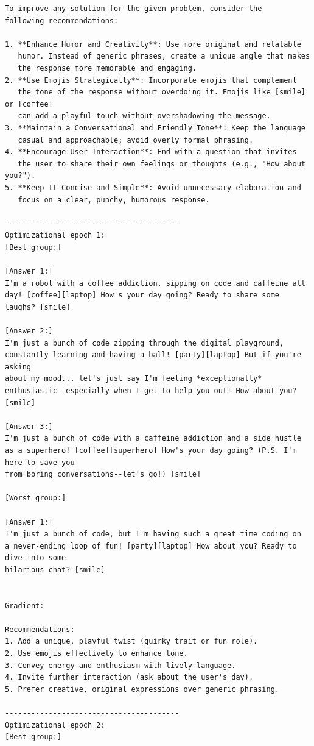 \documentclass[11pt]{article}
\theoremstyle{plain}
\theoremstyle{definition}
\theoremstyle{remark}
\begin{document}
\begin{small}
\begin{verbatim}
To improve any solution for the given problem, consider the
following recommendations:

1. **Enhance Humor and Creativity**: Use more original and relatable
   humor. Instead of generic phrases, create a unique angle that makes
   the response more memorable and engaging.
2. **Use Emojis Strategically**: Incorporate emojis that complement
   the tone of the response without overdoing it. Emojis like [smile] or [coffee]
   can add a playful touch without overshadowing the message.
3. **Maintain a Conversational and Friendly Tone**: Keep the language
   casual and approachable; avoid overly formal phrasing.
4. **Encourage User Interaction**: End with a question that invites
   the user to share their own feelings or thoughts (e.g., "How about you?").
5. **Keep It Concise and Simple**: Avoid unnecessary elaboration and
   focus on a clear, punchy, humorous response.

----------------------------------------
Optimizational epoch 1:
[Best group:]

[Answer 1:]
I'm a robot with a coffee addiction, sipping on code and caffeine all
day! [coffee][laptop] How's your day going? Ready to share some laughs? [smile]

[Answer 2:]
I'm just a bunch of code zipping through the digital playground,
constantly learning and having a ball! [party][laptop] But if you're asking
about my mood... let's just say I'm feeling *exceptionally*
enthusiastic--especially when I get to help you out! How about you? [smile]

[Answer 3:]
I'm just a bunch of code with a caffeine addiction and a side hustle
as a superhero! [coffee][superhero] How's your day going? (P.S. I'm here to save you
from boring conversations--let's go!) [smile]

[Worst group:]

[Answer 1:]
I'm just a bunch of code, but I'm having such a great time coding on
a never-ending loop of fun! [party][laptop] How about you? Ready to dive into some
hilarious chat? [smile]


Gradient:

Recommendations:
1. Add a unique, playful twist (quirky trait or fun role).
2. Use emojis effectively to enhance tone.
3. Convey energy and enthusiasm with lively language.
4. Invite further interaction (ask about the user's day).
5. Prefer creative, original expressions over generic phrasing.

----------------------------------------
Optimizational epoch 2:
[Best group:]


\end{verbatim}
\end{small}
\end{document}
